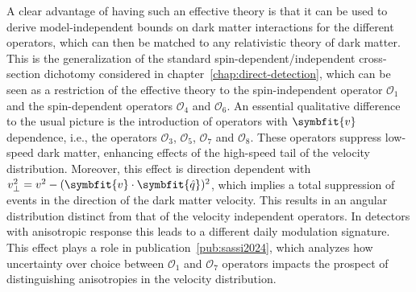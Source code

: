 \documentclass[b5paper, 10pt, twoside]{book}
\renewcommand{\vec}[1]{\symbfit{#1}}
\newcommand{\unitv}[1]{\symbfit{\hat{#1}}}
\begin{document}
A clear advantage of having such an effective theory is that it can be used to derive model-independent bounds on dark matter interactions for the different operators, which can then be matched to any relativistic theory of dark matter. This is the generalization of the standard spin-dependent/independent cross-section dichotomy considered in chapter~\ref{chap:direct-detection}, which can be seen as a restriction of the effective theory to the spin-independent operator $\mathcal{O}_1$ and the spin-dependent operators $\mathcal{O}_4$ and $\mathcal{O}_6$. An essential qualitative difference to the usual picture is the introduction of operators with $\vec{v}$ dependence, i.e., the operators $\mathcal{O}_3$, $\mathcal{O}_5$, $\mathcal{O}_7$ and $\mathcal{O}_8$. These operators suppress low-speed dark matter, enhancing effects of the high-speed tail of the velocity distribution. Moreover, this effect is direction dependent with $v_\perp^2=v^2-(\vec{v}\cdot\unitv{q})^2$, which implies a total suppression of events in the direction of the dark matter velocity. This results in an angular distribution distinct from that of the velocity independent operators. In detectors with anisotropic response this leads to a different daily modulation signature. This effect plays a role in publication~\ref{pub:sassi2024}, which analyzes how uncertainty over choice between $\mathcal{O}_1$ and $\mathcal{O}_7$ operators impacts the prospect of distinguishing anisotropies in the velocity distribution.
\end{document}
